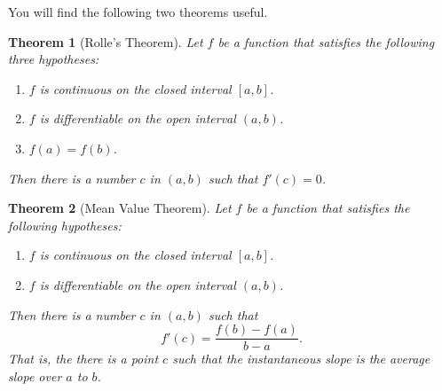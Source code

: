 \documentclass[letterpaper,11pt]{article}
\newtheorem{theorem}{Theorem}
\begin{document}

You will find the following two theorems useful.

\begin{theorem}[Rolle's Theorem]
    Let $f$ be a function that satisfies the following three hypotheses:
    \begin{enumerate}
        \item $f$ is continuous on the closed interval $[a,b]$.
        \item $f$ is differentiable on the open interval $(a,b)$.
        \item $f(a) = f(b)$.
    \end{enumerate}
    Then there is a number $c$ in $(a,b)$ such that $f'(c) = 0$.
\end{theorem}

\begin{theorem}[Mean Value Theorem]
    Let $f$ be a function that satisfies the following hypotheses:
    \begin{enumerate}
        \item $f$ is continuous on the closed interval $[a,b]$.
        \item $f$ is differentiable on the open interval $(a,b)$.
    \end{enumerate}
    Then there is a number $c$ in $(a,b)$ such that
    \[f'(c) = \frac{f(b) - f(a)}{b-a}.\]
    That is, the there is a point $c$ such that the instantaneous slope is the average slope over $a$ to $b$.
\end{theorem}
\end{document}
